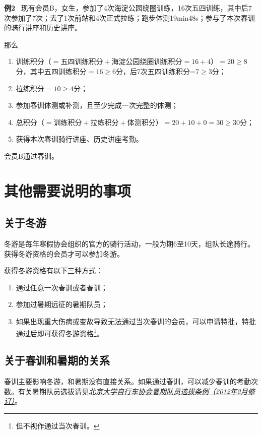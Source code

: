 \documentclass[UTF8]{ctexart}
\begin{document}
\small{
    \textbf{例2} \ 现有会员B，女生，参加了4次海淀公园绕圈训练，16次五四训练，其中后7次参加了7次；去了1次前站和4次正式拉练；跑步体测19min48s；参与了本次春训的骑行讲座和历史讲座。

那么
\begin{enumerate}[nosep,left=4em]
    \item 训练积分（$=\text{五四训练积分}+\text{海淀公园绕圈训练积分}=16+4$）$=20\ge 8$分，其中五四训练积分$=16\ge 6$分，后7次五四训练积分=7$\ge 3$分；
    \item 拉练积分$=10\ge 4$分；
    \item 参加春训体测或补测，且至少完成一次完整的体测；
    \item 总积分（$=\text{训练积分}+\text{拉练积分}+\text{体测积分}$）$=20+10+0=30\ge 30$分；
    \item 获得本次春训骑行讲座、历史讲座考勤。
\end{enumerate}

会员B通过春训。

}



\section{其他需要说明的事项}

\subsection{关于冬游}

冬游是每年寒假协会组织的官方的骑行活动，一般为期6至10天，组队长途骑行。获得冬游资格的会员才可以参加冬游。

获得冬游资格有以下三种方式：
\begin{enumerate}[nosep,left=2em]
    \item 通过任意一次春训或者春训；
    \item 参加过暑期远征的暑期队员；
    \item 如果出现重大伤病或变故导致无法通过当次春训的会员，可以申请特批，特批通过后即可获得冬游资格\footnote{但不视作通过当次春训。}。
\end{enumerate}

\subsection{关于春训和暑期的关系}

春训主要影响冬游，和暑期没有直接关系。如果通过春训，可以减少春训的考勤次数。有关暑期队员选拔请见\href{https://chexie.net/bbs/content/?bid=1&tid=9610&p=1}{\textit{北京大学自行车协会暑期队员选拔条例（2012年2月修订）}}。
\clearpage
\appendix
\end{document}
